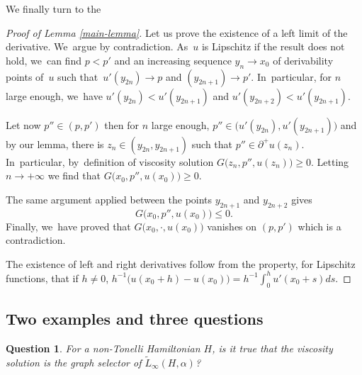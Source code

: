 \documentclass[10pt]{amsart}
\newtheorem{question}{Question}
\theoremstyle{definition}
\let\Subsection\subsection\let\Subsubsection\subsubsection
\begin{document}
\begin{appendix}
We finally turn to the
\begin{proof}[Proof of Lemma \ref{main-lemma}]
Let us prove the existence of a left limit of the derivative. We~argue by contradiction. As~$u$ is Lipschitz if the result does not hold, we~can find \hbox{$p<p'$} and an increasing sequence $y_n \!\to\! x_0$ of derivability points of~$u$ such that~\hbox{$u'(y_{2n}) \!\to\! p$} and $(y_{2n+1}) \to p'$. In~particular, for $n$ large enough, we~have $u'(y_{2n})<u'(y_{2n+1})$ and $u'(y_{2n+2})<u'(y_{2n+1})$.

Let now $p'' \in(p,p')$ then for $n$ large enough, $p'' \in \bigl(u'(y_{2n}),u'(y_{2n+1})\bigr)$ and by our lemma, there is $z_n \in (y_{2n},y_{2n+1})$ such that $p'' \in \partial^+ u(z_n)$. In~particular, by~definition of viscosity solution $G\bigl(z_n,p'',u(z_n)\bigr)\geqslant 0$. Letting $n\to +\infty$ we find that $G(x_0,p'',u(x_0)\bigr) \geqslant 0$.

The same argument applied between the points $y_{2n+1}$ and $y_{2n+2}$ gives\vspace*{-3pt}
\[
G(x_0,p'',u(x_0)\bigr) \leqslant 0.
\]
Finally, we~have proved that $G(x_0,\cdot ,u(x_0)\bigr)$ vanishes on $(p,p')$ which is a contradiction.

The existence of left and right derivatives follow from the property, for Lipschitz functions, that if $h\neq 0$, $h^{-1}\bigl(u(x_0+h)- u(x_0)\bigr) = h^{-1}\int_0^h u'(x_0+s)ds$.
\end{proof}

\Subsection{Two examples and three questions}

\begin{question}\label{quest:1}
For a non-Tonelli Hamiltonian $H$, is it true that the viscosity solution is the graph selector of $\tilde L_\infty(H,\alpha)$?
\end{question}


\end{appendix}
\end{document}
